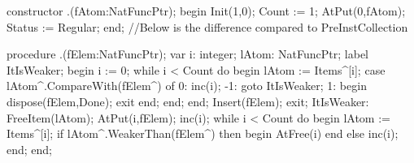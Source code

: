 \nwenddocs{}\endmoddef\nwstartdeflinemarkup\nwenddeflinemarkup
constructor .(fAtom:NatFuncPtr);
begin
   Init(1,0);
   Count := 1;
   AtPut(0,fAtom);
   Status := Regular;
end;
\eatline
{}\nwendcode{}\nwdocspar
\nwenddocs{}\endmoddef\nwstartdeflinemarkup\nwenddeflinemarkup
//Below is the difference compared to PreInstCollection

procedure .(fElem:NatFuncPtr);
var
   i: integer;
   lAtom: NatFuncPtr;
label ItIsWeaker;
begin
   i := 0;
   while i < Count do
   begin
      lAtom := Items^[i];
      case lAtom^.CompareWith(fElem^) of
         0: inc(i);
         -1: goto ItIsWeaker;
         1: begin dispose(fElem,Done); exit end;
      end;
   end;
   Insert(fElem);
   exit;
ItIsWeaker:
   FreeItem(lAtom); AtPut(i,fElem); inc(i);
   while i < Count do
   begin
      lAtom := Items^[i];
      if lAtom^.WeakerThan(fElem^) then
      begin
         AtFree(i)
      end
      else inc(i);
   end;
end;

